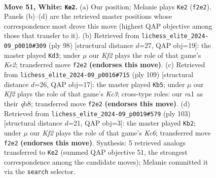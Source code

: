 \documentclass[11pt]{article}
\begin{document}
\clearpage

\begin{figure}[p]\centering
\begin{subfigure}{0.46\textwidth}\centering
\resizebox{\linewidth}{!}{%
\newchessgame
\chessboard[
  setfen={8/1R3p2/p3pk2/8/PR2P3/5P1P/5K2/r7 w - - 8 51},
  showmover=false,
  pgfstyle=straightmove, color=movearrow, markmove={f2-e2}
]}
\caption{}
\end{subfigure}\hfill
\begin{subfigure}{0.46\textwidth}\centering
\resizebox{\linewidth}{!}{%
\newchessgame
\chessboard[
  setfen={7k/R2R2p1/7p/7P/2rP2P1/8/4K3/8 w - - 7 50},
  showmover=false,
  pgfstyle=straightmove, color=movearrow, markmove={e2-d3}
]}
\caption{}
\end{subfigure}
\\[4pt]
\begin{subfigure}{0.46\textwidth}\centering
\resizebox{\linewidth}{!}{%
\newchessgame
\chessboard[
  setfen={1Q6/p4r2/1pk5/3p1r2/1P3P2/4P3/P3K3/8 b - - 0 55},
  showmover=false,
  pgfstyle=straightmove, color=movearrow, markmove={c6-b5}
]}
\caption{}
\end{subfigure}\hfill
\begin{subfigure}{0.46\textwidth}\centering
\resizebox{\linewidth}{!}{%
\newchessgame
\chessboard[
  setfen={8/p1R5/r5p1/P6p/8/1rk4P/5PK1/8 b - - 15 52},
  showmover=false,
  pgfstyle=straightmove, color=movearrow, markmove={c3-b2}
]}
\caption{}
\end{subfigure}
\caption{\textbf{Move 51, White: \texttt{Ke2}.} (a) Our position; Melanie plays \texttt{Ke2} (\texttt{f2e2}). Panels (b)--(d) are the retrieved master positions whose correspondence most drove this move (highest QAP objective among those that transfer to it). (b) Retrieved from \texttt{lichess\_elite\_2024-09\_p0010\#309} (ply 98) [structural distance $d$=27, QAP obj=19]: the master played \texttt{Kd3}; under $\mu$ our \emph{Kf2} plays the role of that game's \emph{Ke2}; transferred move \texttt{f2e2} \textbf{(endorses this move)}. (c) Retrieved from \texttt{lichess\_elite\_2024-09\_p0016\#715} (ply 109) [structural distance $d$=26, QAP obj=17]: the master played \texttt{Kb5}; under $\mu$ our \emph{Kf2} plays the role of that game's \emph{Kc3}; cross-type roles: our \emph{r}a1 as their \emph{q}b8; transferred move \texttt{f2e2} \textbf{(endorses this move)}. (d) Retrieved from \texttt{lichess\_elite\_2024-09\_p0019\#579} (ply 103) [structural distance $d$=21, QAP obj=3]: the master played \texttt{Kb2}; under $\mu$ our \emph{Kf2} plays the role of that game's \emph{Kc6}; transferred move \texttt{f2e2} \textbf{(endorses this move)}. Synthesis: 5 retrieved analogs transferred to \texttt{Ke2} (summed QAP objective 51, the strongest correspondence among the candidate moves); Melanie committed it via the \texttt{search} selector.}
\label{fig:thought-m100}
\end{figure}
\end{document}
